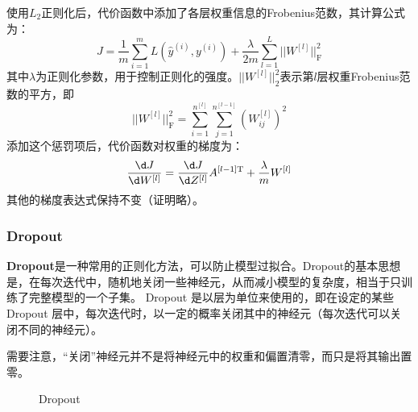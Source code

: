 使用$L_2$正则化后，代价函数中添加了各层权重信息的Frobenius范数，其计算公式为：
\begin{equation}
    J = \frac{1}{m}\sum_{i=1}^mL(\hat{y}^{(i)}, y^{(i)}) + \frac{\lambda}{2m}\sum_{l=1}^L||W^{[l]}||_{\mathrm{F}}^2
\end{equation}
其中$\lambda$为正则化参数，用于控制正则化的强度。$||W^{[l]}||_2^2$表示第$l$层权重Frobenius范数的平方，即
\begin{equation}
    ||W^{[l]}||_{\mathrm{F}}^2 = \sum_{i=1}^{n^{[l]}}\sum_{j=1}^{n^{[l-1]}}(W_{ij}^{[l]})^2
\end{equation}
添加这个惩罚项后，代价函数对权重的梯度为：
\begin{equation}
    \frac{\d J}{\d W^{[l]}} = \frac{\d J}{\d Z^{[l]}} A^{[l-1] \mathrm{T}} + \frac{\lambda}{m}W^{[l]}
\end{equation}
其他的梯度表达式保持不变（证明略）。

\subsubsection{Dropout}

\textbf{Dropout}是一种常用的正则化方法，可以防止模型过拟合。Dropout的基本思想是，在每次迭代中，随机地关闭一些神经元，从而减小模型的复杂度，相当于只训练了完整模型的一个子集。
Dropout 是以层为单位来使用的，即在设定的某些 Dropout 层中，每次迭代时，以一定的概率关闭其中的神经元（每次迭代可以关闭不同的神经元）。

需要注意，“关闭”神经元并不是将神经元中的权重和偏置清零，而只是将其输出置零。

\begin{figure}[h!bt]
    \centering
    \centering
    \caption{Dropout}
    \label{fig:dropout}
\end{figure}


